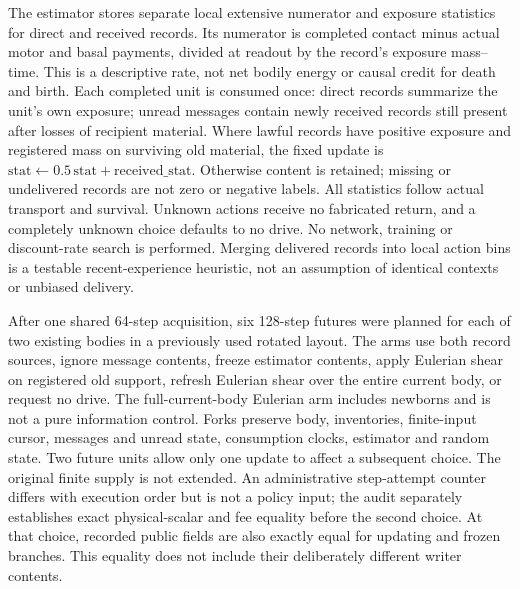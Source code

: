 The estimator stores separate local extensive numerator and exposure statistics for direct and received records. Its numerator is completed contact minus actual motor and basal payments, divided at readout by the record's exposure mass--time. This is a descriptive rate, not net bodily energy or causal credit for death and birth. Each completed unit is consumed once: direct records summarize the unit's own exposure; unread messages contain newly received records still present after losses of recipient material. Where lawful records have positive exposure and registered mass on surviving old material, the fixed update is $\mathrm{stat}\leftarrow0.5\,\mathrm{stat}+\mathrm{received\_stat}$. Otherwise content is retained; missing or undelivered records are not zero or negative labels. All statistics follow actual transport and survival. Unknown actions receive no fabricated return, and a completely unknown choice defaults to no drive. No network, training or discount-rate search is performed. Merging delivered records into local action bins is a testable recent-experience heuristic, not an assumption of identical contexts or unbiased delivery.

After one shared 64-step acquisition, six 128-step futures were planned for each of two existing bodies in a previously used rotated layout. The arms use both record sources, ignore message contents, freeze estimator contents, apply Eulerian shear on registered old support, refresh Eulerian shear over the entire current body, or request no drive. The full-current-body Eulerian arm includes newborns and is not a pure information control. Forks preserve body, inventories, finite-input cursor, messages and unread state, consumption clocks, estimator and random state. Two future units allow only one update to affect a subsequent choice. The original finite supply is not extended. An administrative step-attempt counter differs with execution order but is not a policy input; the audit separately establishes exact physical-scalar and fee equality before the second choice. At that choice, recorded public fields are also exactly equal for updating and frozen branches. This equality does not include their deliberately different writer contents.

